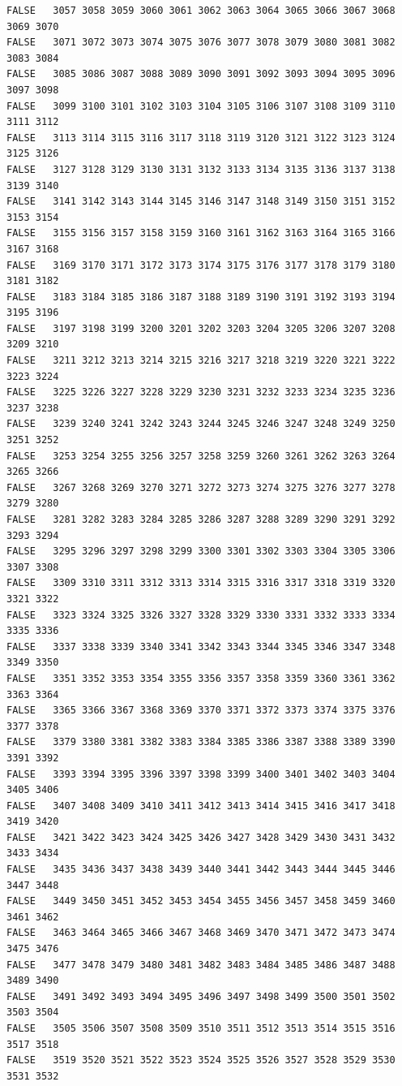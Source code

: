 \documentclass[]{article}
\begin{document}
\begin{verbatim}
FALSE   3057 3058 3059 3060 3061 3062 3063 3064 3065 3066 3067 3068 3069 3070
FALSE   3071 3072 3073 3074 3075 3076 3077 3078 3079 3080 3081 3082 3083 3084
FALSE   3085 3086 3087 3088 3089 3090 3091 3092 3093 3094 3095 3096 3097 3098
FALSE   3099 3100 3101 3102 3103 3104 3105 3106 3107 3108 3109 3110 3111 3112
FALSE   3113 3114 3115 3116 3117 3118 3119 3120 3121 3122 3123 3124 3125 3126
FALSE   3127 3128 3129 3130 3131 3132 3133 3134 3135 3136 3137 3138 3139 3140
FALSE   3141 3142 3143 3144 3145 3146 3147 3148 3149 3150 3151 3152 3153 3154
FALSE   3155 3156 3157 3158 3159 3160 3161 3162 3163 3164 3165 3166 3167 3168
FALSE   3169 3170 3171 3172 3173 3174 3175 3176 3177 3178 3179 3180 3181 3182
FALSE   3183 3184 3185 3186 3187 3188 3189 3190 3191 3192 3193 3194 3195 3196
FALSE   3197 3198 3199 3200 3201 3202 3203 3204 3205 3206 3207 3208 3209 3210
FALSE   3211 3212 3213 3214 3215 3216 3217 3218 3219 3220 3221 3222 3223 3224
FALSE   3225 3226 3227 3228 3229 3230 3231 3232 3233 3234 3235 3236 3237 3238
FALSE   3239 3240 3241 3242 3243 3244 3245 3246 3247 3248 3249 3250 3251 3252
FALSE   3253 3254 3255 3256 3257 3258 3259 3260 3261 3262 3263 3264 3265 3266
FALSE   3267 3268 3269 3270 3271 3272 3273 3274 3275 3276 3277 3278 3279 3280
FALSE   3281 3282 3283 3284 3285 3286 3287 3288 3289 3290 3291 3292 3293 3294
FALSE   3295 3296 3297 3298 3299 3300 3301 3302 3303 3304 3305 3306 3307 3308
FALSE   3309 3310 3311 3312 3313 3314 3315 3316 3317 3318 3319 3320 3321 3322
FALSE   3323 3324 3325 3326 3327 3328 3329 3330 3331 3332 3333 3334 3335 3336
FALSE   3337 3338 3339 3340 3341 3342 3343 3344 3345 3346 3347 3348 3349 3350
FALSE   3351 3352 3353 3354 3355 3356 3357 3358 3359 3360 3361 3362 3363 3364
FALSE   3365 3366 3367 3368 3369 3370 3371 3372 3373 3374 3375 3376 3377 3378
FALSE   3379 3380 3381 3382 3383 3384 3385 3386 3387 3388 3389 3390 3391 3392
FALSE   3393 3394 3395 3396 3397 3398 3399 3400 3401 3402 3403 3404 3405 3406
FALSE   3407 3408 3409 3410 3411 3412 3413 3414 3415 3416 3417 3418 3419 3420
FALSE   3421 3422 3423 3424 3425 3426 3427 3428 3429 3430 3431 3432 3433 3434
FALSE   3435 3436 3437 3438 3439 3440 3441 3442 3443 3444 3445 3446 3447 3448
FALSE   3449 3450 3451 3452 3453 3454 3455 3456 3457 3458 3459 3460 3461 3462
FALSE   3463 3464 3465 3466 3467 3468 3469 3470 3471 3472 3473 3474 3475 3476
FALSE   3477 3478 3479 3480 3481 3482 3483 3484 3485 3486 3487 3488 3489 3490
FALSE   3491 3492 3493 3494 3495 3496 3497 3498 3499 3500 3501 3502 3503 3504
FALSE   3505 3506 3507 3508 3509 3510 3511 3512 3513 3514 3515 3516 3517 3518
FALSE   3519 3520 3521 3522 3523 3524 3525 3526 3527 3528 3529 3530 3531 3532

\end{verbatim}
\end{document}
